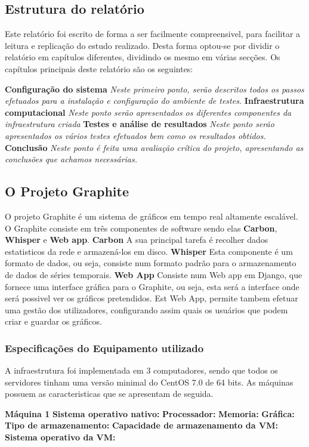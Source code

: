 \subsection{Estrutura do relatório}
Este relatório foi escrito de forma a ser facilmente compreensivel, para facilitar a leitura e replicação do estudo realizado.
Desta forma optou-se por dividir o relatório em capítulos diferentes, dividindo os mesmo em várias secções. Os capítulos principais deste relatório são os seguintes:

\textbf{Configuração do sistema} \textit{Neste primeiro ponto, serão descritos todos os passos efetuados para a instalação e configuração do ambiente de testes.}
\textbf{Infraestrutura computacional} \textit{Neste ponto serão apresentados os diferentes componentes da infraestrutura criada}
\textbf{Testes e análise de resultados} \textit{Neste ponto serão apresentados os vários testes efetuados bem como os resultados obtidos.}
\textbf{Conclusão} \textit{Neste ponto é feita uma avaliação crítica do projeto, apresentando as conclusões que achamos necessárias.}

\subsection{O Projeto Graphite}
O projeto Graphite é um sistema de gráficos em tempo real altamente escalável. O Graphite consiste em três componentes de software sendo elas \textbf{Carbon}, \textbf{Whisper} e \textbf{Web app}.
\textbf{Carbon} A sua principal tarefa é recolher dados estatisticos da rede e armazená-los em disco.
\textbf{Whisper} Esta componente é um formato de dados, ou seja, consiste num formato padrão para o armazenamento de dados de séries temporais.
\textbf{Web App} Consiste num Web app em Django, que fornece uma interface gráfica para o Graphite, ou seja, esta será a interface onde será possivel ver os gráficos pretendidos. Est Web App, permite tambem efetuar uma gestão dos utilizadores, configurando assim quais os usuários que podem criar e guardar os gráficos.

\subsubsection{Especificações do Equipamento utilizado}
A infraestrutura foi implementada em 3 computadores, sendo que todos os servidores tinham uma versão minimal do CentOS 7.0 de 64 bits. As máquinas possuem as caracteristicas que se apresentam de seguida.

\textbf{Máquina 1}
\textbf{Sistema operativo nativo:} \textit{}
\textbf{Processador:} \textit{}
\textbf{Memoria:} \textit{}
\textbf{Gráfica:} \textit{}
\textbf{Tipo de armazenamento:} \textit{}
\textbf{Capacidade de armazenamento da VM:} \textit{}
\textbf{Sistema operativo da VM:} \textit{}


